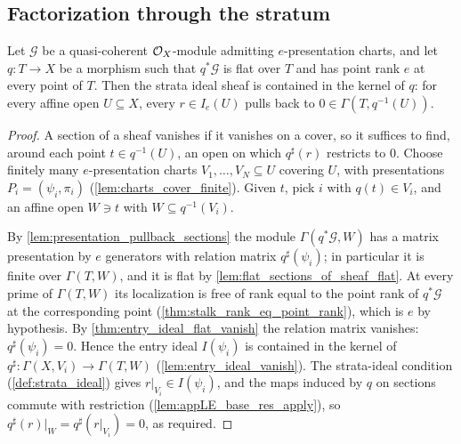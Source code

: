 \subsection{Factorization through the stratum}

\begin{theorem}
  \label{thm:strata_ideal_le_ker}
  \leanok
  Let \(\mathcal G\) be a quasi-coherent \(\mathcal{O}_X\)-module admitting
  \(e\)-presentation charts, and let \(q : T \to X\) be a morphism such that
  \(q^*\mathcal G\) is flat over \(T\) and has point rank \(e\) at every
  point of \(T\).  Then the strata ideal sheaf is contained in the kernel of
  \(q\): for every affine open \(U \subseteq X\), every \(r \in I_e(U)\)
  pulls back to \(0 \in \Gamma(T, q^{-1}(U))\).
\end{theorem}

\begin{proof}
  \leanok
  A section of a sheaf vanishes if it vanishes on a cover, so it suffices to
  find, around each point \(t \in q^{-1}(U)\), an open on which
  \(q^\sharp(r)\) restricts to \(0\).  Choose finitely many
  \(e\)-presentation charts \(V_1, \dots, V_N \subseteq U\) covering \(U\),
  with presentations \(P_i = (\psi_i, \pi_i)\)
  (\cref{lem:charts_cover_finite}).  Given \(t\), pick \(i\) with
  \(q(t) \in V_i\), and an affine open \(W \ni t\) with
  \(W \subseteq q^{-1}(V_i)\).

  By \cref{lem:presentation_pullback_sections} the module
  \(\Gamma(q^*\mathcal G, W)\) has a matrix presentation by \(e\) generators
  with relation matrix \(q^\sharp(\psi_i)\); in particular it is finite over
  \(\Gamma(T, W)\), and it is flat by
  \cref{lem:flat_sections_of_sheaf_flat}.  At every prime of
  \(\Gamma(T, W)\) its localization is free of rank equal to the point rank
  of \(q^*\mathcal G\) at the corresponding point
  (\cref{thm:stalk_rank_eq_point_rank}), which is \(e\) by hypothesis.  By
  \cref{thm:entry_ideal_flat_vanish} the relation matrix vanishes:
  \(q^\sharp(\psi_i) = 0\).  Hence the entry ideal \(I(\psi_i)\) is
  contained in the kernel of
  \(q^\sharp : \Gamma(X, V_i) \to \Gamma(T, W)\)
  (\cref{lem:entry_ideal_vanish}).  The strata-ideal condition
  (\cref{def:strata_ideal}) gives \(r|_{V_i} \in I(\psi_i)\), and the maps
  induced by \(q\) on sections commute with restriction
  (\cref{lem:appLE_base_res_apply}), so
  \(q^\sharp(r)|_W = q^\sharp(r|_{V_i}) = 0\), as required.
\end{proof}

